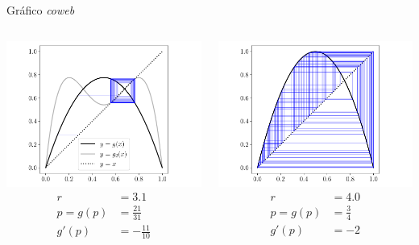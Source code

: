 \documentclass[9pt, aspectratio=169]{beamer}
\begin{document}
\begin{frame}{Gráfico \textit{coweb}}
\begin{columns}
\begin{center}
    \includegraphics[scale=0.35]{figs/coweb-02.pdf}
    \begin{align*}
        r &= 3.1 \\
    p = g(p) &= \frac{21}{31} \\
    g'(p) &= -\frac{11}{10}
    \end{align*}
\end{center} \pause

\begin{center}
    \includegraphics[scale=0.35]{figs/coweb-03.pdf}
    \begin{align*}
        r &= 4.0 \\
    p = g(p) &= \frac{3}{4} \\
    g'(p) &= -2
    \end{align*}
\end{center}
\end{columns}
\end{frame}
\end{document}
